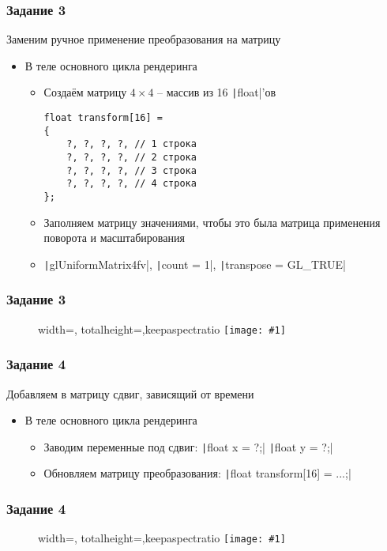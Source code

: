 \documentclass[10pt]{beamer}
\newcommand{\slideimage}[1]{
  \begin{figure}
    \begin{adjustbox}{width=\textwidth, totalheight=\textheight-2\baselineskip-2\baselineskip,keepaspectratio}
      \texttt{[image: \#1]}
    \end{adjustbox}
  \end{figure}
}
\begin{document}
\begin{frame}[fragile]
\frametitle{Задание 3}
Заменим ручное применение преобразования на матрицу
\begin{itemize}
\item В теле основного цикла рендеринга
\begin{itemize}
\item Создаём матрицу \begin{math}4\times 4\end{math} -- массив из 16 \texttt|float|'ов
\begin{verbatim}
float transform[16] =
{
    ?, ?, ?, ?, // 1 строка
    ?, ?, ?, ?, // 2 строка
    ?, ?, ?, ?, // 3 строка
    ?, ?, ?, ?, // 4 строка
};
\end{verbatim}
\item Заполняем матрицу значениями, чтобы это была матрица применения поворота и масштабирования
\item \texttt|glUniformMatrix4fv|, \texttt|count = 1|, \texttt|transpose = GL_TRUE|
\end{itemize}
\end{itemize}
\end{frame}

\begin{frame}
\frametitle{Задание 3}
\slideimage{2.png}
\end{frame}

\begin{frame}[fragile]
\frametitle{Задание 4}
Добавляем в матрицу сдвиг, зависящий от времени
\begin{itemize}
\item В теле основного цикла рендеринга
\begin{itemize}
\item Заводим переменные под сдвиг:
\texttt|float x = ?;|
\texttt|float y = ?;|
\item Обновляем матрицу преобразования:
\texttt|float transform[16] = ...;|
\end{itemize}
\end{itemize}
\end{frame}

\begin{frame}
\frametitle{Задание 4}
\slideimage{4.png}
\end{frame}
\end{document}
